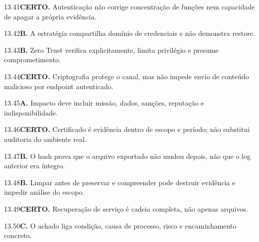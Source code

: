 \begin{solucao}{13.41}\textbf{CERTO.} Autenticação não corrige concentração de funções nem capacidade de apagar a própria evidência.\end{solucao}
\begin{solucao}{13.42}\textbf{B.} A estratégia compartilha domínio de credenciais e não demonstra restore.\end{solucao}
\begin{solucao}{13.43}\textbf{B.} Zero Trust verifica explicitamente, limita privilégio e presume comprometimento.\end{solucao}
\begin{solucao}{13.44}\textbf{CERTO.} Criptografia protege o canal, mas não impede envio de conteúdo malicioso por endpoint autenticado.\end{solucao}
\begin{solucao}{13.45}\textbf{A.} Impacto deve incluir missão, dados, sanções, reputação e indisponibilidade.\end{solucao}
\begin{solucao}{13.46}\textbf{CERTO.} Certificado é evidência dentro de escopo e período; não substitui auditoria do ambiente real.\end{solucao}
\begin{solucao}{13.47}\textbf{B.} O hash prova que o arquivo exportado não mudou depois, não que o log anterior era íntegro.\end{solucao}
\begin{solucao}{13.48}\textbf{B.} Limpar antes de preservar e compreender pode destruir evidência e impedir análise do escopo.\end{solucao}
\begin{solucao}{13.49}\textbf{CERTO.} Recuperação de serviço é cadeia completa, não apenas arquivos.\end{solucao}
\begin{solucao}{13.50}\textbf{C.} O achado liga condição, causa de processo, risco e encaminhamento concreto.\end{solucao}
